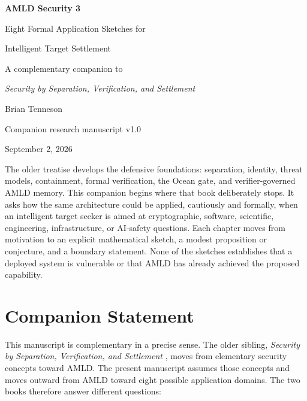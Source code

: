 \documentclass[11pt,oneside]{book}
\theoremstyle{definition}
\theoremstyle{remark}
\begin{document}
\frontmatter
\hypersetup{pageanchor=false}
\begin{titlepage}
\centering
\vspace*{1.05in}
{\Huge\bfseries AMLD Security 3\par}
\vspace{0.25in}
{\Large Eight Formal Application Sketches for\par}
\vspace{0.08in}
{\Large Intelligent Target Settlement\par}
\vspace{0.45in}
{\large A complementary companion to\par}
\vspace{0.08in}
{\large\itshape Security by Separation, Verification, and Settlement\par}
\vspace{0.65in}
{\large Brian Tenneson\par}
\vspace{0.22in}
{\large Companion research manuscript v1.0\par}
\vspace{0.08in}
{\large September 2, 2026\par}
\vfill
\begin{minipage}{0.84\textwidth}
\small
The older treatise develops the defensive foundations: separation, identity, threat models,
containment, formal verification, the Ocean gate, and verifier-governed AMLD memory. This
companion begins where that book deliberately stops. It asks how the same architecture could be
applied, cautiously and formally, when an intelligent target seeker is aimed at cryptographic,
software, scientific, engineering, infrastructure, or AI-safety questions. Each chapter moves from
motivation to an explicit mathematical sketch, a modest proposition or conjecture, and a boundary
statement. None of the sketches establishes that a deployed system is vulnerable or that AMLD has
already achieved the proposed capability.
\end{minipage}
\end{titlepage}
\hypersetup{pageanchor=true}

\chapter*{Companion Statement}
This manuscript is complementary in a precise sense. The older sibling, \emph{Security by
Separation, Verification, and Settlement} \cite{TennesonSecurity}, moves from elementary security
concepts toward AMLD. The present manuscript assumes those concepts and moves outward from AMLD
toward eight possible application domains. The two books therefore answer different questions:
\end{document}
